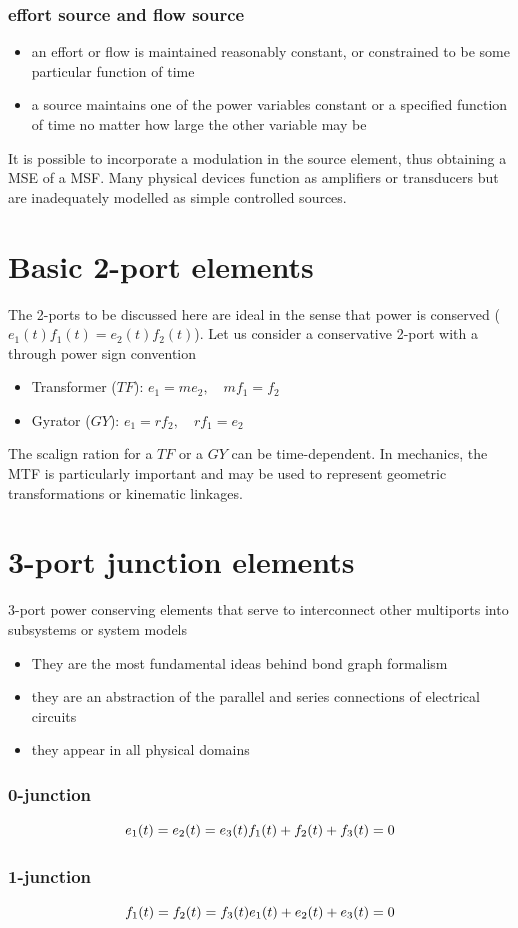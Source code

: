 \documentclass{book}
\begin{document}
\subsubsection{effort source and flow source}
\begin{itemize}
    \item an effort or flow is maintained reasonably constant, or constrained to be some particular function of time 
    \item a source maintains one of the power variables constant or a specified function of time no matter how large the other variable may be
\end{itemize}
It is possible to incorporate a modulation in the source element, thus obtaining a MSE of a MSF. Many physical devices function as amplifiers or transducers but are inadequately modelled as simple controlled sources.

\section{Basic 2-port elements}

The 2-ports to be discussed here are ideal in the sense that power is conserved ($e_1(t)f_1(t) = e_2(t)f_2(t)$). Let us consider a conservative 2-port with a through power sign convention
\begin{itemize}
    \item Transformer ($TF$): $e_1 = me_2, \quad mf_1=f_2$
    \item Gyrator ($GY$): $e_1=rf_2, \quad rf_1=e_2$
\end{itemize}

The scalign ration for a $TF$ or a $GY$ can be time-dependent. In mechanics, the MTF is particularly important and may be used to represent geometric transformations or kinematic linkages.

\section{3-port junction elements}
3-port power conserving elements that serve to interconnect other multiports into subsystems or system models 
\begin{itemize}
    \item They are the most fundamental ideas behind bond graph formalism
    \item they are an abstraction of the parallel and series connections of electrical circuits 
    \item they appear in all physical domains
\end{itemize}
\subsubsection{0-junction}
\[
    e_1(t)=e_2(t)=e_3(t)\\
    f_1(t)+f_2(t)+f_3(t)=0
\]
\subsubsection{1-junction}
\[
    f_1(t)=f_2(t)=f_3(t)\\
    e_1(t)+e_2(t)+e_3(t)=0
\]
\end{document}
